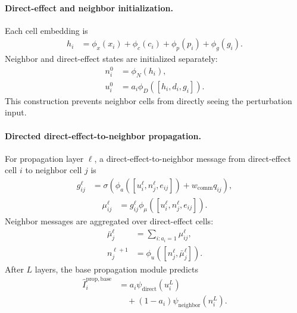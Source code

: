 \documentclass[sigconf,review,balance=false]{acmart}
\begin{document}
\paragraph{Direct-effect and neighbor initialization.}
Each cell embedding is
\[
\begin{aligned}
h_i
&=
\phi_x(x_i)+\phi_c(c_i)+\phi_p(p_i)+\phi_g(g_i).
\end{aligned}
\]
Neighbor and direct-effect states are initialized separately:
\[
\begin{aligned}
n_i^0
&=\phi_N(h_i),\\
u_i^0
&=a_i\phi_D([h_i,d_i,g_i]).
\end{aligned}
\]
This construction prevents neighbor cells from directly seeing the perturbation input.

\paragraph{Directed direct-effect-to-neighbor propagation.}
For propagation layer $\ell$, a direct-effect-to-neighbor message from direct-effect cell $i$ to neighbor cell $j$ is
\[
\begin{aligned}
g_{ij}^{\ell}
&=
\sigma\!\left(
\phi_a([u_i^\ell,n_j^\ell,e_{ij}])
+
w_{\mathrm{comm}}q_{ij}
\right),
\end{aligned}
\]
\[
\begin{aligned}
\mu_{ij}^{\ell}
&=
g_{ij}^{\ell}
\phi_\mu([u_i^\ell,n_j^\ell,e_{ij}]).
\end{aligned}
\]
Neighbor messages are aggregated over direct-effect cells:
\[
\begin{aligned}
\bar\mu_j^\ell
&=
\sum_{i:a_i=1}\mu_{ij}^{\ell},\\
n_j^{\ell+1}
&=
\phi_u([n_j^\ell,\bar\mu_j^\ell]).
\end{aligned}
\]
After $L$ layers, the base propagation module predicts
\[
\begin{aligned}
\widehat I_i^{\mathrm{prop},\mathrm{base}}
&=
a_i\psi_{\mathrm{direct}}(u_i^L)
\\
&\quad +
(1-a_i)\psi_{\mathrm{neighbor}}(n_i^L).
\end{aligned}
\]
\end{document}
